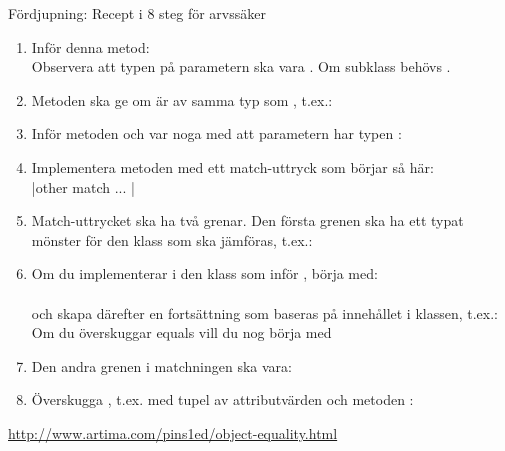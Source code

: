 \begin{Slide}{Fördjupning: Recept i 8 steg för arvssäker }\SlideFontTiny
\SlideOnly{\setlength{\leftmargini}{0pt}}
\begin{enumerate}\SlideFontTiny
\item Inför denna metod: \\Observera att typen på parametern ska vara . Om subklass behövs .

\item Metoden  ska ge  om  är av samma typ som , t.ex.: 

\item Inför metoden  och var noga med att parametern har typen : \\ 

\item Implementera metoden  med ett match-uttryck som börjar så här: \\
\code|other match { ... } |

\item Match-uttrycket ska ha två grenar. Den första grenen ska ha ett typat mönster för den klass som ska jämföras, t.ex.: \\ 

\item Om du implementerar  i den klass som inför , börja med: \\  \\
och skapa därefter en fortsättning som baseras på innehållet i klassen, t.ex.:  \\
Om du överskuggar equals vill du nog börja med

\item Den andra grenen i matchningen ska vara:

\item Överskugga , t.ex. med tupel av attributvärden och metoden \code{##}: \\

\end{enumerate}
\url{http://www.artima.com/pins1ed/object-equality.html}

\end{Slide}
